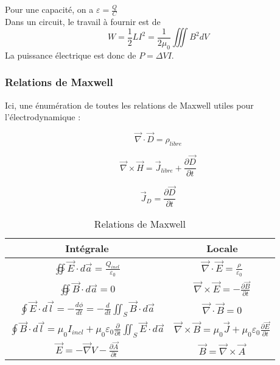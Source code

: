 \documentclass[../main.tex]{subfiles}
\begin{document}
Pour une capacité, on a $\varepsilon = \frac{Q}{C}$\\

Dans un circuit, le travail à fournir est de \\
\begin{equation}
    W = \frac{1}{2} LI^2 = \frac{1}{2\mu_0} \iiint B^2dV
\end{equation}
La puissance électrique est donc de $P = \Delta V I$.\\

\subsubsection{Relations de Maxwell}
Ici, une énumération de toutes les relations de Maxwell utiles pour l'électrodynamique :\\

\begin{minipage}{.25\textwidth}
\begin{equation}
    \vec{\nabla} \cdot \vec{D} = \rho_{libre}
\end{equation}
\end{minipage}
\hfill
\begin{minipage}{.25\textwidth}
    \begin{equation}
        \vec{\nabla} \times \vec{H} = \vec{J}_{libre} + \frac{\partial \vec{D}}{\partial t}
    \end{equation}
\end{minipage}
\hfill
\begin{minipage}{.25\textwidth}
    \begin{equation}
        \vec{J}_D = \frac{\partial \vec{D}}{\partial t}
    \end{equation}
\end{minipage}

\begin{table}[hbt!]
    \centering
    \begin{tabular}{||c|c|}
    \hline
        Intégrale & Locale \\
        \hline
        $\oiint \vec{E}\cdot d\vec{a} = \frac{Q_{incl}}{\varepsilon_0}$ & $\vec{\nabla} \cdot \vec{E} = \frac{\rho}{\varepsilon_0}$\\
        $\oiint \vec{B}\cdot d\vec{a} = 0$ & $\vec{\nabla} \times \vec{E} = -\frac{\partial \vec{B}}{\partial t}$\\
        $\oint \vec{E}\cdot d\vec{l} = -\frac{d\phi}{dt} = -\frac{d}{dt}\iint_S \vec{B}\cdot d\vec{a}$ & $\vec{\nabla} \cdot \vec{B} = 0$\\
        $\oint \vec{B}\cdot d\vec{l} = \mu_0 I_{incl} + \mu_0 \varepsilon_0 \frac{\partial}{\partial t} \iint_S \vec{E}\cdot d\vec{a}$& $\vec{\nabla} \times \vec{B} = \mu_0 \vec{J} + \mu_0 \varepsilon_0 \frac{\partial \vec{E}}{\partial t}$\\
        $\vec{E} = -\vec{\nabla} V - \frac{\partial \vec{A}}{\partial t}$ & $\vec{B} = \vec{\nabla} \times \vec{A}$\\
        \hline
    \end{tabular}
    \caption{Relations de Maxwell}
\end{table}
\end{document}

